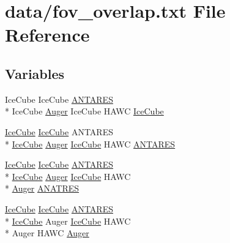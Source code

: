 \hypertarget{fov__overlap_8txt}{\section{data/fov\-\_\-overlap.txt File Reference}
\label{fov__overlap_8txt}
}
\subsection*{Variables}
\begin{DoxyCompactItemize}
\item 
Ice\-Cube Ice\-Cube \hyperlink{fov__overlap_8txt_a2526b3e8e5fc40d14d7a2871e61c52f5}{A\-N\-T\-A\-R\-E\-S} \\*
Ice\-Cube \hyperlink{fov__overlap_8txt_ab9538ff5d47f88ccf055854dda669e45}{Auger} Ice\-Cube H\-A\-W\-C \hyperlink{fov__overlap_8txt_ae2c8b183622f423151bc24babc6afee5}{Ice\-Cube}
\item 
\hyperlink{fov__overlap_8txt_ae2c8b183622f423151bc24babc6afee5}{Ice\-Cube} \hyperlink{fov__overlap_8txt_ae2c8b183622f423151bc24babc6afee5}{Ice\-Cube} A\-N\-T\-A\-R\-E\-S \\*
\hyperlink{fov__overlap_8txt_ae2c8b183622f423151bc24babc6afee5}{Ice\-Cube} \hyperlink{fov__overlap_8txt_ab9538ff5d47f88ccf055854dda669e45}{Auger} \hyperlink{fov__overlap_8txt_ae2c8b183622f423151bc24babc6afee5}{Ice\-Cube} H\-A\-W\-C \hyperlink{fov__overlap_8txt_a2526b3e8e5fc40d14d7a2871e61c52f5}{A\-N\-T\-A\-R\-E\-S}
\item 
\hyperlink{fov__overlap_8txt_ae2c8b183622f423151bc24babc6afee5}{Ice\-Cube} \hyperlink{fov__overlap_8txt_ae2c8b183622f423151bc24babc6afee5}{Ice\-Cube} \hyperlink{fov__overlap_8txt_a2526b3e8e5fc40d14d7a2871e61c52f5}{A\-N\-T\-A\-R\-E\-S} \\*
\hyperlink{fov__overlap_8txt_ae2c8b183622f423151bc24babc6afee5}{Ice\-Cube} \hyperlink{fov__overlap_8txt_ab9538ff5d47f88ccf055854dda669e45}{Auger} \hyperlink{fov__overlap_8txt_ae2c8b183622f423151bc24babc6afee5}{Ice\-Cube} H\-A\-W\-C \\*
\hyperlink{fov__overlap_8txt_ab9538ff5d47f88ccf055854dda669e45}{Auger} \hyperlink{fov__overlap_8txt_aaf6038de2ed54d0799de63d0b3809ba7}{A\-N\-A\-T\-R\-E\-S}
\item 
\hyperlink{fov__overlap_8txt_ae2c8b183622f423151bc24babc6afee5}{Ice\-Cube} \hyperlink{fov__overlap_8txt_ae2c8b183622f423151bc24babc6afee5}{Ice\-Cube} \hyperlink{fov__overlap_8txt_a2526b3e8e5fc40d14d7a2871e61c52f5}{A\-N\-T\-A\-R\-E\-S} \\*
\hyperlink{fov__overlap_8txt_ae2c8b183622f423151bc24babc6afee5}{Ice\-Cube} Auger \hyperlink{fov__overlap_8txt_ae2c8b183622f423151bc24babc6afee5}{Ice\-Cube} H\-A\-W\-C \\*
Auger H\-A\-W\-C \hyperlink{fov__overlap_8txt_ab9538ff5d47f88ccf055854dda669e45}{Auger}
\end{DoxyCompactItemize}


